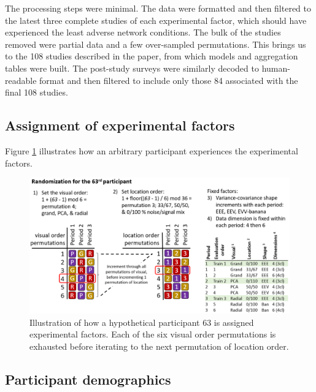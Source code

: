 \documentclass[
]{article}
\begin{document}
The processing steps were minimal. The data were formatted and then filtered to the latest three complete studies of each experimental factor, which should have experienced the least adverse network conditions. The bulk of the studies removed were partial data and a few over-sampled permutations. This brings us to the 108 studies described in the paper, from which models and aggregation tables were built. The post-study surveys were similarly decoded to human-readable format and then filtered to include only those 84 associated with the final 108 studies.

\hypertarget{assignment-of-experimental-factors}{%
\subsection{Assignment of experimental factors}\label{assignment-of-experimental-factors}}

Figure \ref{fig:figParmeterizationExample} illustrates how an arbitrary participant experiences the experimental factors.

\begin{figure}

{\centering \includegraphics[width=1\linewidth]{./figures/figParmeterizationExample} 

}

\caption{Illustration of how a hypothetical participant 63 is assigned experimental factors. Each of the six visual order permutations is exhausted before iterating to the next permutation of location order.}\label{fig:figParmeterizationExample}
\end{figure}

\hypertarget{sec:demographics}{%
\subsection{Participant demographics}\label{sec:demographics}}
\end{document}
